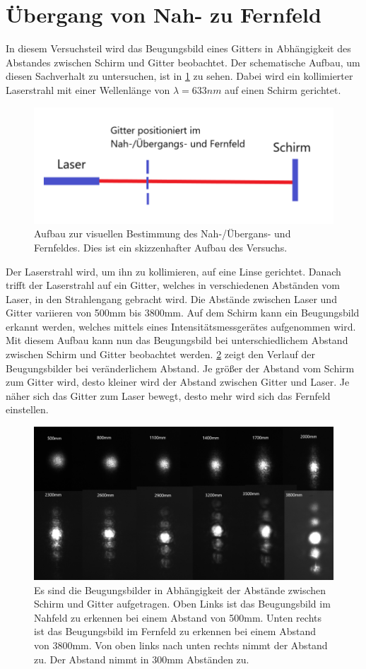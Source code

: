\section{Übergang von Nah- zu Fernfeld}
In diesem Versuchsteil wird das Beugungsbild eines Gitters in Abhängigkeit des Abstandes zwischen Schirm und Gitter beobachtet. Der schematische Aufbau, um diesen Sachverhalt zu untersuchen, ist in \cref{Lana1} zu sehen.
Dabei wird ein kollimierter Laserstrahl mit einer Wellenlänge von $\lambda = 633 nm$ auf einen Schirm gerichtet. 
\begin{figure}[h!]
	\centering
	\includegraphics[scale = 0.65]{Lana-Bild1.png}
	\caption{Aufbau zur visuellen Bestimmung des Nah-/Übergans- und Fernfeldes. Dies ist ein skizzenhafter Aufbau des Versuchs.}
	\label{Lana1}
\end{figure}
Der Laserstrahl wird, um ihn zu kollimieren, auf eine Linse gerichtet.
Danach trifft der Laserstrahl auf ein Gitter, welches in verschiedenen Abständen vom Laser, in den Strahlengang gebracht wird. Die Abstände zwischen Laser und Gitter variieren von 500mm bis 3800mm. Auf dem Schirm kann ein Beugungsbild erkannt werden, welches mittels eines Intensitätsmessgerätes aufgenommen wird.
Mit diesem Aufbau kann nun das Beugungsbild bei unterschiedlichem Abstand zwischen Schirm und Gitter beobachtet werden. \cref{alle} zeigt den Verlauf der Beugungsbilder bei veränderlichem Abstand. Je größer der Abstand vom Schirm zum Gitter wird, desto kleiner wird der Abstand zwischen Gitter und Laser. Je näher sich das Gitter zum Laser bewegt, desto mehr wird sich das Fernfeld einstellen.
\begin{figure}[h!]
	\centering
	\includegraphics[scale = 0.65]{alleabstande.png}
	\caption{Es sind die Beugungsbilder in Abhängigkeit der Abstände zwischen Schirm und Gitter aufgetragen. Oben Links ist das Beugungsbild im Nahfeld zu erkennen bei einem Abstand von 500mm. Unten rechts ist das Beugungsbild im Fernfeld zu erkennen bei einem Abstand von 3800mm. Von oben links nach unten rechts nimmt der Abstand zu. Der Abstand nimmt in 300mm Abständen zu.}
	\label{alle}
\end{figure}
